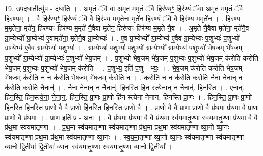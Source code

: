 \documentclass[17pt]{extarticle}
\begin{document}
19. उ॒प॒दधा॒तीत्यु॑प - दधा॑ति । . अ॒मृतं॒ ॅवै वा अ॒मृत॑ म॒मृतं॒ ॅवै हिर॑ण्यꣳ॒॒ हिर॑ण्यं॒ ॅवा अ॒मृत॑ म॒मृतं॒ ॅवै हिर॑ण्यम् । . वै हिर॑ण्यꣳ॒॒ हिर॑ण्यं॒ ॅवै वै हिर॑ण्य म॒मृते॑ना॒ मृते॑न॒ हिर॑ण्यं॒ ॅवै वै हिर॑ण्य म॒मृते॑न । . हिर॑ण्य म॒मृते॑ना॒ मृते॑न॒ हिर॑ण्यꣳ॒॒ हिर॑ण्य म॒मृते॑ नै॒वैवा मृते॑न॒ हिर॑ण्यꣳ॒॒ हिर॑ण्य म॒मृते॑ नै॒व । . अ॒मृते॑ नै॒वैवा मृते॑ना॒ मृते॑नै॒व ग्रा॒म्येभ्यो᳚ ग्रा॒म्येभ्य॑ ए॒वामृते॑ना॒ मृते॑नै॒व ग्रा॒म्येभ्यः॑ । . ए॒व ग्रा॒म्येभ्यो᳚ ग्रा॒म्येभ्य॑ ए॒वैव ग्रा॒म्येभ्यः॑ प॒शुभ्यः॑ प॒शुभ्यो᳚ ग्रा॒म्येभ्य॑ ए॒वैव ग्रा॒म्येभ्यः॑ प॒शुभ्यः॑ । . ग्रा॒म्येभ्यः॑ प॒शुभ्यः॑ प॒शुभ्यो᳚ ग्रा॒म्येभ्यो᳚ ग्रा॒म्येभ्यः॑ प॒शुभ्यो॑ भेष॒जम् भे॑ष॒जम् प॒शुभ्यो᳚ ग्रा॒म्येभ्यो᳚ ग्रा॒म्येभ्यः॑ प॒शुभ्यो॑ भेष॒जम् । . प॒शुभ्यो॑ भेष॒जम् भे॑ष॒जम् प॒शुभ्यः॑ प॒शुभ्यो॑ भेष॒जम् क॑रोति करोति भेष॒जम् प॒शुभ्यः॑ प॒शुभ्यो॑ भेष॒जम् क॑रोति । . प॒शुभ्य॒ इति॑ प॒शु - भ्यः॒ । . भे॒ष॒जम् क॑रोति करोति भेष॒जम् भे॑ष॒जम् क॑रोति॒ न न क॑रोति भेष॒जम् भे॑ष॒जम् क॑रोति॒ न । . क॒रो॒ति॒ न न क॑रोति करोति॒ नैना॑ नेना॒न् न क॑रोति करोति॒ नैनान्॑ । . नैना॑ नेना॒न् न नैनान्॑. हिनस्ति हिन स्त्येना॒न् न नैनान्॑. हिनस्ति । . ए॒ना॒न्॒. हि॒न॒स्ति॒ हि॒न॒स्त्ये॒ना॒ ने॒ना॒न्॒. हि॒न॒स्ति॒ प्रा॒णः प्रा॒णो हि॑न स्त्येना नेनान्. हिनस्ति प्रा॒णः । . हि॒न॒स्ति॒ प्रा॒णः प्रा॒णो हि॑नस्ति हिनस्ति प्रा॒णो वै वै प्रा॒णो हि॑नस्ति हिनस्ति प्रा॒णो वै । . प्रा॒णो वै वै प्रा॒णः प्रा॒णो वै प्र॑थ॒मा प्र॑थ॒मा वै प्रा॒णः प्रा॒णो वै प्र॑थ॒मा । . प्रा॒ण इति॑ प्र - अ॒नः । . वै प्र॑थ॒मा प्र॑थ॒मा वै वै प्र॑थ॒मा स्व॑यमातृ॒ण्णा स्व॑यमातृ॒ण्णा प्र॑थ॒मा वै वै प्र॑थ॒मा स्व॑यमातृ॒ण्णा । . प्र॒थ॒मा स्व॑यमातृ॒ण्णा स्व॑यमातृ॒ण्णा प्र॑थ॒मा प्र॑थ॒मा स्व॑यमातृ॒ण्णा व्या॒नो व्या॒नः स्व॑यमातृ॒ण्णा प्र॑थ॒मा प्र॑थ॒मा स्व॑यमातृ॒ण्णा व्या॒नः । . स्व॒य॒मा॒तृ॒ण्णा व्या॒नो व्या॒नः स्व॑यमातृ॒ण्णा स्व॑यमातृ॒ण्णा व्या॒नो द्वि॒तीया᳚ द्वि॒तीया᳚ व्या॒नः स्व॑यमातृ॒ण्णा स्व॑यमातृ॒ण्णा व्या॒नो द्वि॒तीया᳚ । \newline
\end{document}
